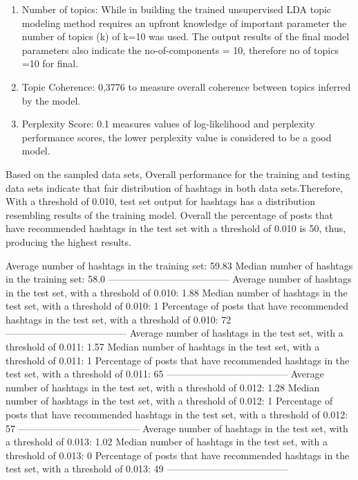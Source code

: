 \begin{enumerate}
    \item Number of topics: While in building the trained unsupervised LDA topic modeling method requires an upfront knowledge of important parameter the number of topics (k) of k=10  was used.  The output results of the final model parameters also indicate the no-of-components = 10, therefore no of topics =10 for final.
    \item Topic Coherence: 0,3776 to measure overall coherence between topics inferred by the model.   
    \item Perplexity Score: 0.1 measures values of log-likelihood and perplexity performance scores, the lower perplexity value is considered to be a good model.   
\end{enumerate}

Based on the sampled data sets, Overall performance for the training and testing data sets indicate that fair distribution of hashtags in both data sets.Therefore, With a threshold of 0.010, test set output for hashtags has a distribution resembling results of the training model.  Overall the percentage of posts that have recommended hashtags in the test set with a threshold of 0.010 is 50, thus, producing the highest results.

Average number of hashtags in the training set: 59.83
Median number of hashtags in the training set:  58.0
--------------------------------------
Average number of hashtags in the test set, with a threshold of 0.010: 1.88
Median number of hashtags in the test set, with a threshold of 0.010: 1
Percentage of posts that have recommended hashtags in the test set, with a threshold of 0.010: 72
--------------------------------------
Average number of hashtags in the test set, with a threshold of 0.011: 1.57
Median number of hashtags in the test set, with a threshold of 0.011: 1
Percentage of posts that have recommended hashtags in the test set, with a threshold of 0.011: 65
--------------------------------------
Average number of hashtags in the test set, with a threshold of 0.012: 1.28
Median number of hashtags in the test set, with a threshold of 0.012: 1
Percentage of posts that have recommended hashtags in the test set, with a threshold of 0.012: 57
--------------------------------------
Average number of hashtags in the test set, with a threshold of 0.013: 1.02
Median number of hashtags in the test set, with a threshold of 0.013: 0
Percentage of posts that have recommended hashtags in the test set, with a threshold of 0.013: 49
-------------------------------------- 
    
